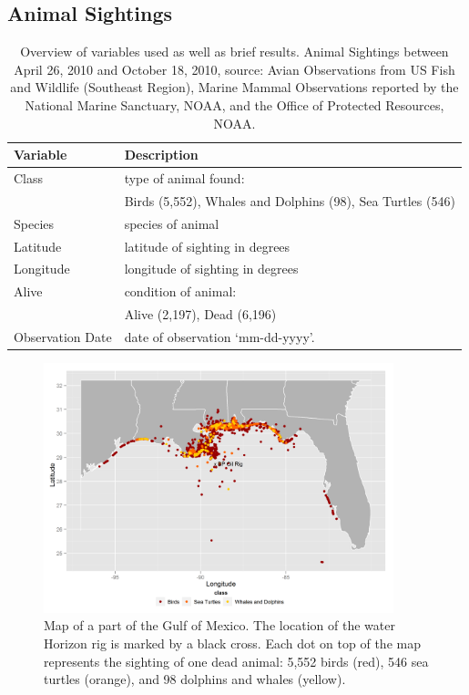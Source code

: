 \documentclass[authoryear,12pt]{elsarticle}
\begin{document}
\subsection{Animal Sightings}
\begin{table}
\begin{tabular}[hbt]{lp{11cm}}\hline
\bf Variable & \bf Description \\\hline
Class & type of animal found: \\
& {\small Birds (5,552),   Whales and Dolphins  (98),  Sea Turtles (546)}\\
Species & species of animal \\
Latitude & latitude {of sighting} in degrees  \\
Longitude & longitude {of sighting} in degrees\\
Alive & condition of animal: \\
& {\small Alive (2,197), Dead (6,196)} \\
Observation Date & date of observation `mm-dd-yyyy'. \\\hline
\end{tabular}
\caption{Overview of variables used as well as brief results. Animal Sightings between April 26, 2010 and October 18, 2010, source: Avian Observations from US Fish and Wildlife (Southeast Region),  Marine Mammal Observations reported by  the National Marine Sanctuary, NOAA, and the Office of Protected Resources, NOAA.}
\label{table-animal}
\end{table}
\begin{figure}[htbp] %
   \centering
   \includegraphics[width=4in]{animal_deaths.png} 
   \caption{Map of a part of the Gulf of Mexico. The location of the 
water Horizon rig is marked by a black cross. Each dot on top of the map represents the sighting of one dead animal: 5,552  birds (red), 546 sea turtles (orange), and 98 dolphins and whales (yellow). }
   \label{deaths}
\end{figure}
\end{document}
